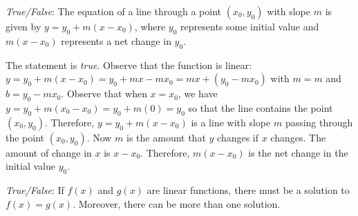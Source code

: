 \documentclass[11pt,letterpaper]{article}
\begin{document}
\quizsol \textit{True/False}: The equation of a line through a point $(x_0, y_0)$ with slope $m$ is given by $y= y_0 + m(x - x_0)$, where $y_0$ represents some initial value and $m(x - x_0)$ represents a net change in $y_0$. \pspace

\sol The statement is \textit{true}. Observe that the function is linear: $y= y_0 + m(x - x_0)= y_0 + mx - mx_0= mx + (y_0 - mx_0)$ with $m= m$ and $b= y_0 - mx_0$. Observe that when $x= x_0$, we have $y= y_0 + m(x_0 - x_0)= y_0 + m(0)= y_0$ so that the line contains the point $(x_0 , y_0)$. Therefore, $y= y_0 + m(x - x_0)$ is a line with slope $m$ passing through the point $(x_0, y_0)$. Now $m$ is the amount that $y$ changes if $x$ changes. The amount of change in $x$ is $x - x_0$. Therefore, $m(x - x_0)$ is the net change in the initial value $y_0$. 



\quizsol \textit{True/False}: If $f(x)$ and $g(x)$ are linear functions, there must be a solution to $f(x)= g(x)$. Moreover, there can be more than one solution. \par

\sol 
\end{document}

